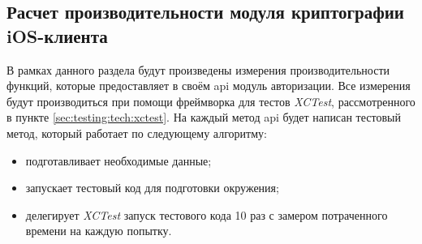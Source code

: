 \subsection{Расчет производительности модуля криптографии iOS-клиента}
\label{sec:eng:performance}

В рамках данного раздела будут произведены измерения производительности функций, которые предоставляет в своём \gls{api} модуль авторизации. Все измерения будут производиться при помощи фреймворка для тестов \textit{XCTest}, рассмотренного в пункте \ref{sec:testing:tech:xctest}. На каждый метод \gls{api} будет написан тестовый метод, который работает по следующему алгоритму:

\begin{itemize}
	\item подготавливает необходимые данные;
	\item запускает тестовый код для подготовки окружения;
	\item делегирует \textit{XCTest} запуск тестового кода 10 раз с замером потраченного времени на каждую попытку.
\end{itemize}

